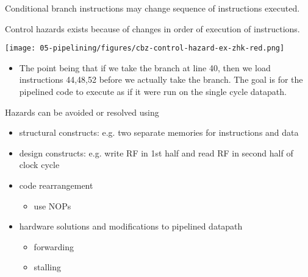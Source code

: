   \begin{frame}[fragile]
  Conditional branch instructions may change sequence of instructions executed. 
  
  Control hazards exists because of changes in order of execution of instructions. 
  \begin{center}
\texttt{[image: 05-pipelining/figures/cbz-control-hazard-ex-zhk-red.png]}
      
  \end{center}

\BNotes\ifnum{}
\begin{itemize}
\item The point being that if we take the branch at line 40, then we load instructions 44,48,52 before we actually take the branch.  The goal is for the pipelined code to execute as if it were run on the single cycle datapath.
\end{itemize}
\fi\ENotes
\end{frame}

\begin{frame}[fragile]
Hazards can be avoided or resolved using
\begin{itemize}
   \item structural constructs: e.g. two separate memories for instructions and data 
    \item design constructs: e.g. write RF in 1st half and read RF in second half of clock cycle
    \item code rearrangement
    \begin{itemize}
        \item use NOPs
    \end{itemize}
    \item hardware solutions and modifications to pipelined datapath
    \begin{itemize}
        \item forwarding
        \item stalling 
    \end{itemize}
\end{itemize} 
    
\end{frame}

